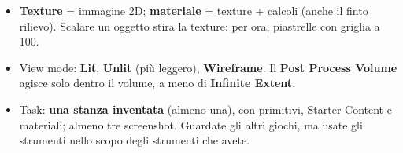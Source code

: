 \begin{itemize}
        \textbf{cielo} (Sky Light, Sky Atmosphere, fog, nuvole, sky sphere): in
        pratica si copiano i contenuti della cartella \emph{Lighting}. Lumen
        simula i riflessi della luce in tempo reale.
  \item \textbf{Texture} = immagine 2D; \textbf{materiale} = texture + calcoli
        (anche il finto rilievo). Scalare un oggetto stira la texture: per ora,
        piastrelle con griglia a 100.
  \item View mode: \textbf{Lit}, \textbf{Unlit} (più leggero), \textbf{Wireframe}.
        Il \textbf{Post Process Volume} agisce solo dentro il volume, a meno
        di \textbf{Infinite Extent}.
  \item Task: \textbf{una stanza inventata} (almeno una), con primitivi,
        Starter Content e materiali; almeno tre screenshot. Guardate gli altri
        giochi, ma usate gli strumenti nello scopo degli strumenti che avete.
\end{itemize}
